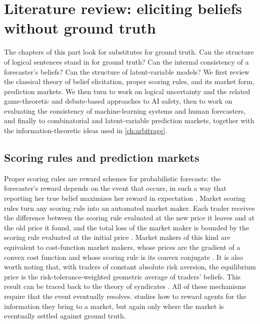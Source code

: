 \chapter{Literature review: eliciting beliefs without ground truth}\label{ch:litrev-subjective}

\begin{draftblock}
\noindent The chapters of this part look for substitutes for ground truth. Can the structure of logical sentences stand in for ground truth? Can the internal consistency of a forecaster's beliefs? Can the structure of latent-variable models? We first review the classical theory of belief elicitation, proper scoring rules, and its market form, prediction markets. We then turn to work on logical uncertainty and the related game-theoretic and debate-based approaches to AI safety, then to work on evaluating the consistency of machine-learning systems and human forecasters, and finally to combinatorial and latent-variable prediction markets, together with the information-theoretic ideas used in \cref{ch:arbitrage}.
\end{draftblock}

\section{Scoring rules and prediction markets}\label{litrev:sec:scoring}
\begin{draftblock}
Proper scoring rules are reward schemes for probabilistic forecasts: the forecaster's reward depends on the event that occurs, in such a way that reporting her true belief maximizes her reward in expectation \citep{goodRationalDecisions1952,savageElicitationPersonalProbabilities1971,gneitingStrictlyProperScoring2007}. Market scoring rules turn any scoring rule into an automated market maker. Each trader receives the difference between the scoring rule evaluated at the new price it leaves and at the old price it found, and the total loss of the market maker is bounded by the scoring rule evaluated at the initial price \citep{hansonLogarithmicMarketScoring2002,hansonCombinatorialInformationMarket2003}. Market makers of this kind are equivalent to cost-function market makers, whose prices are the gradient of a convex cost function and whose scoring rule is its convex conjugate \citep{chenUtilityFrameworkBoundedloss2007,abernethyEfficientMarketMaking2013}. It is also worth noting that, with traders of constant absolute risk aversion, the equilibrium price is the risk-tolerance-weighted geometric average of traders' beliefs. This result can be traced back to the theory of syndicates \citep{wilsonTheorySyndicates1968,abernethyInformationAggregationExponential2014}. All of these mechanisms require that the event eventually resolves. \citet{conitzerPredictionMarketsMechanism2012} studies how to reward agents for the information they bring to a market, but again only where the market is eventually settled against ground truth.
\end{draftblock}

